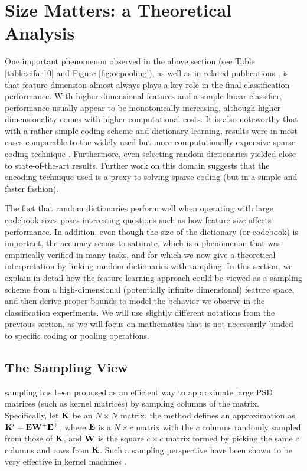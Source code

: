\section{Size Matters: a Theoretical Analysis}

One important phenomenon observed in the above section (see \eg Table \ref{table:cifar10} and Figure \ref{fig:ocpooling}), as well as in related publications \cite{coates2010aistats,coates2011icml}, is that feature dimension almost always plays a key role in the final classification performance. With higher dimensional features and a simple linear classifier, performance usually appear to be monotonically increasing, although higher dimensionality comes with higher computational costs. It is also noteworthy that with a rather simple coding scheme and dictionary learning, results were in most cases comparable to the widely used but more computationally expensive sparse coding technique \cite{coates2011icml}. Furthermore, even selecting random dictionaries yielded close to state-of-the-art results. Further work on this domain \cite{freitas} suggests that the encoding technique used is a proxy to solving sparse coding (but in a simple and faster fashion).

The fact that random dictionaries perform well when operating with large codebook sizes poses interesting questions such as how feature size affects performance. In addition, even though the size of the dictionary (or codebook) is important, the accuracy seems to saturate, which is a phenomenon that was empirically verified in many tasks, and for which we now give a theoretical interpretation by linking random dictionaries with \nystrom sampling. In this section, we explain in detail how the feature learning approach could be viewed as a \nystrom sampling scheme from a high-dimensional (potentially infinite dimensional) feature space, and then derive proper bounds to model the behavior we observe in the classification experiments. We will use slightly different notations from the previous section, as we will focus on mathematics that is not necessarily binded to specific coding or pooling operations.

\subsection{The \nystrom Sampling View}
\nystrom sampling has been proposed as an efficient way to approximate large PSD matrices (such as kernel matrices) by sampling columns of the matrix. Specifically, let $\mathbf{K}$ be an $N\times N$ matrix, the \nystrom method defines an approximation as $\mathbf{K}' = \mathbf{E}\mathbf{W}^{+}\mathbf{E}^\top$, where $\mathbf{E}$ is a $N\times c$ matrix with the $c$ columns randomly sampled from those of $\mathbf{K}$, and $\mathbf{W}$ is the square $c\times c$ matrix formed by picking the same $c$ columns and rows from $\mathbf{K}$. Such a sampling perspective have been shown to be very effective in kernel machines \cite{zhang2008improved,cortes10,kumar2012sampling}.

